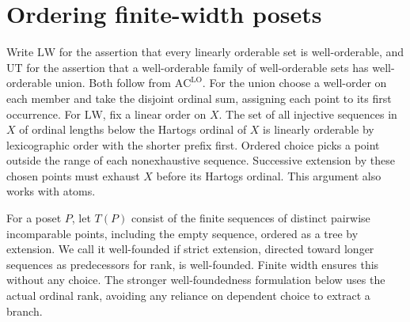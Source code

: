 \documentclass[11pt]{article}
\begin{document}
\section{Ordering finite-width posets}
Write $\mathrm{LW}$ for the assertion that every linearly orderable set is well-orderable, and $\mathrm{UT}$ for the assertion that a well-orderable family of well-orderable sets has well-orderable union. Both follow from $\mathrm{AC}^{\mathrm{LO}}$. For the union choose a well-order on each member and take the disjoint ordinal sum, assigning each point to its first occurrence. For $\mathrm{LW}$, fix a linear order on $X$. The set of all injective sequences in $X$ of ordinal lengths below the Hartogs ordinal of $X$ is linearly orderable by lexicographic order with the shorter prefix first. Ordered choice picks a point outside the range of each nonexhaustive sequence. Successive extension by these chosen points must exhaust $X$ before its Hartogs ordinal. This argument also works with atoms.

For a poset $P$, let $T(P)$ consist of the finite sequences of distinct pairwise incomparable points, including the empty sequence, ordered as a tree by extension. We call it well-founded if strict extension, directed toward longer sequences as predecessors for rank, is well-founded. Finite width ensures this without any choice. The stronger well-foundedness formulation below uses the actual ordinal rank, avoiding any reliance on dependent choice to extract a branch.
\end{document}
